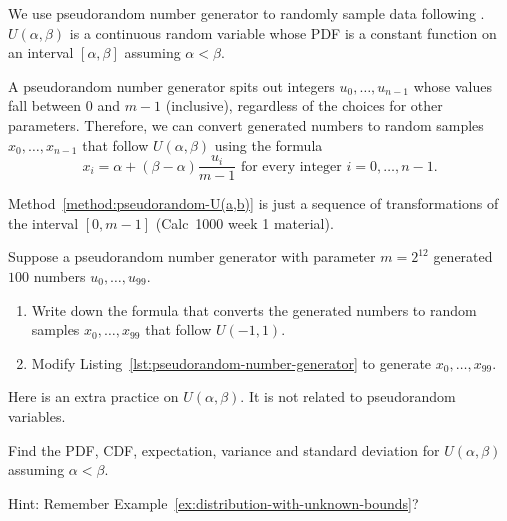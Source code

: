 \documentclass[../main.tex]{subfiles}
\begin{document}
\faStar{} We use pseudorandom number generator to randomly sample data following . \(U(\alpha,\beta)\) is a continuous random variable whose PDF is a constant function on an interval \([\alpha, \beta]\) assuming \(\alpha < \beta\).

\begin{method} \label{method:pseudorandom-U(a,b)}
  A pseudorandom number generator spits out integers \(u_{0}, \ldots, u_{n-1}\) whose values fall between \(0\) and \(m-1\) (inclusive), regardless of the choices for other parameters. Therefore, we can convert generated numbers to random samples \(x_{0}, \ldots, x_{n-1}\) that follow \(U(\alpha,\beta)\) using the formula
  \[
    x_{i} = \alpha + (\beta-\alpha) \frac{u_{i}}{m - 1} \text{ for every integer } i = 0, \ldots, n-1.
  \]
\end{method}

Method~\ref{method:pseudorandom-U(a,b)} is just a sequence of transformations of the interval \([0, m-1]\) (Calc~1000 week 1 material).

\clearpage

\begin{example}
  Suppose a pseudorandom number generator with parameter \(m = 2^{12}\) generated \(100\) numbers \(u_{0}, \ldots, u_{99}\).  
  \begin{enumerate}
    \item Write down the formula that converts the generated numbers to random samples \(x_{0}, \ldots, x_{99}\) that follow \(U(-1, 1)\). 
    \item Modify Listing~\ref{lst:pseudorandom-number-generator} to generate \(x_{0}, \ldots, x_{99}\).
  \end{enumerate}

\end{example}

\medskip
Here is an extra practice on \(U(\alpha,\beta)\). It is not related to pseudorandom variables.
\begin{example}
  Find the PDF, CDF, expectation, variance and standard deviation for \(U(\alpha, \beta)\) assuming \(\alpha < \beta\).
\end{example}
\vfill{}
Hint: Remember Example~\ref{ex:distribution-with-unknown-bounds}?
\end{document}
